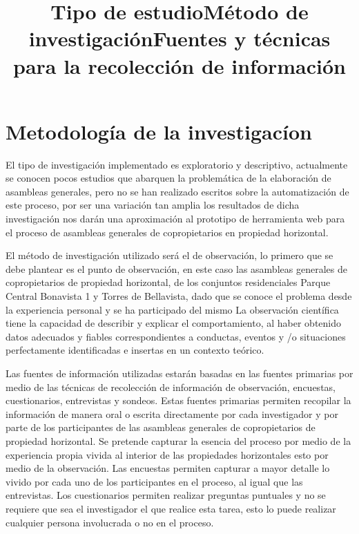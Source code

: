 \section{Metodología de la investigacíon}

\title{Tipo de estudio}

El tipo de investigación implementado es exploratorio y descriptivo, actualmente se conocen pocos estudios que abarquen la problemática de la elaboración de asambleas generales, pero no se han realizado escritos sobre la automatización de este proceso, por ser una variación tan amplia los resultados de dicha investigación nos darán una aproximación al prototipo de herramienta web para el proceso de asambleas generales de copropietarios en propiedad horizontal.

\title{Método de investigación}

El método de investigación utilizado será el de observación, lo primero que se debe plantear es el punto de observación, en este caso las asambleas generales de copropietarios de propiedad horizontal, de los conjuntos residenciales Parque Central Bonavista 1 y Torres de Bellavista, dado que se conoce el problema desde la experiencia personal y se ha participado del mismo
La observación científica tiene la capacidad de describir y explicar el comportamiento, al haber obtenido datos adecuados y fiables correspondientes a conductas, eventos y /o situaciones perfectamente identificadas e insertas en un contexto teórico.

\title{Fuentes y técnicas para la recolección de información}

Las fuentes de información utilizadas estarán basadas en las fuentes primarias por medio de las técnicas de recolección de información de observación, encuestas, cuestionarios, entrevistas y sondeos. Estas fuentes primarias permiten recopilar la información de manera oral o escrita directamente por cada investigador y por parte de los participantes de las asambleas generales de copropietarios de propiedad horizontal.
Se pretende capturar la esencia del proceso por medio de la experiencia propia vivida al interior de las propiedades horizontales esto por medio de la observación. Las encuestas permiten capturar a mayor detalle lo vivido por cada uno de los participantes en el proceso, al igual que las entrevistas. Los cuestionarios permiten realizar preguntas puntuales y no se requiere que sea el investigador el que realice esta tarea, esto lo puede realizar cualquier persona involucrada o no en el proceso.

